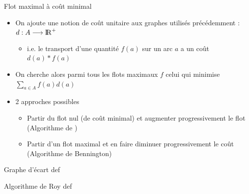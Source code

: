 \begin{frame}{Flot maximal à coût minimal}
    \begin{itemize}
        \item On ajoute une notion de coût unitaire aux graphes utilisés précédemment : $d : A \longrightarrow \mathrm{I\! R}^+$
        \begin{itemize}
            \item i.e. le transport d'une quantité $f(a)$ sur un arc $a$ a un coût $d(a)*f(a)$ 
        \end{itemize}
        \item On cherche alors parmi tous les flots maximaux $f$ celui qui minimise $\sum_{a \in A} f(a)d(a)$
        \item 2 approches possibles 
        \begin{itemize}
            \item Partir du flot nul (de coût minimal) et augmenter progressivement le flot (Algorithme de \Roy)
            \item Partir d'un flot maximal et en faire diminuer progressivement le coût (Algorithme de Bennington)
        \end{itemize}
    \end{itemize}
\end{frame}

\begin{frame}{Graphe d'écart}
    def
\end{frame}

\begin{frame}{Algorithme de Roy}
\label{alg:roy}
def 
\end{frame}
